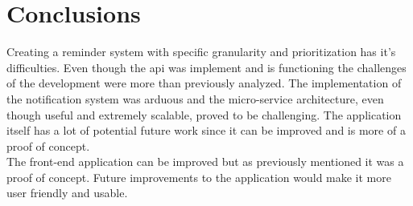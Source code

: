 \chapter{Conclusions}

	Creating a reminder system with specific granularity and prioritization has it's difficulties. Even though the \gls{api} was implement and is functioning the challenges of the development were more than previously analyzed. The implementation of the notification system was arduous and the micro-service architecture, even though useful and extremely scalable, proved to be challenging. The application itself has a lot of potential future work since it can be improved and is more of a proof of concept.\\
	The front-end application can be improved but as previously mentioned it was a proof of concept.
	Future improvements to the application would make it more user friendly and usable.